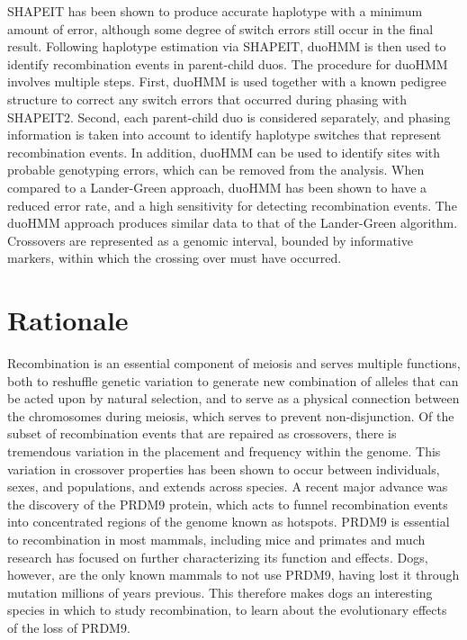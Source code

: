 SHAPEIT has been shown to produce accurate haplotype with a minimum amount of error, although some degree of switch errors still occur in the final result.
Following haplotype estimation via SHAPEIT, duoHMM\cite{OConnell2014} is then used to identify recombination events in parent-child duos.
The procedure for duoHMM involves multiple steps.
First, duoHMM is used together with a known pedigree structure to correct any switch errors that occurred during phasing with SHAPEIT2.
Second, each parent-child duo is considered separately, and phasing information is taken into account to identify haplotype switches that represent recombination events.
In addition, duoHMM can be used to identify sites with probable genotyping errors, which can be removed from the analysis.
When compared to a Lander-Green approach, duoHMM has been shown to have a reduced error rate, and a high sensitivity for detecting recombination events\cite{OConnell2014}.
The duoHMM approach produces similar data to that of the Lander-Green algorithm.
Crossovers are represented as a genomic interval, bounded by informative markers, within which the crossing over must have occurred.





\section{Rationale}

Recombination is an essential component of meiosis and serves multiple functions, both to reshuffle genetic variation to generate new combination of alleles that can be acted upon by natural selection, and to serve as a physical connection between the chromosomes during meiosis, which serves to prevent non-disjunction.
Of the subset of recombination events that are repaired as crossovers, there is tremendous variation in the placement and frequency within the genome.
This variation in crossover properties has been shown to occur between individuals, sexes, and populations, and extends across species.
A recent major advance was the discovery of the PRDM9 protein, which acts to funnel recombination events into concentrated regions of the genome known as hotspots.
PRDM9 is essential to recombination in most mammals, including mice and primates and much research has focused on further characterizing its function and effects.
Dogs, however, are the only known mammals to not use PRDM9, having lost it through mutation millions of years previous.
This therefore makes dogs an interesting species in which to study recombination, to learn about the evolutionary effects of the loss of PRDM9.


